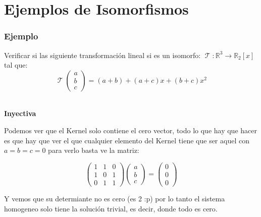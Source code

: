 \documentclass[12pt]{report}                                    %
\DeclareMathOperator \LinealTransformation {\mathcal{T}}        %
\begin{document}
    \section{Ejemplos de Isomorfismos}



            \subsubsection{Ejemplo}
            Verificar si las siguiente transformación lineal si es un isomorfo:
            $\LinealTransformation : \mathbb{R}^3 \to \mathbb{R}_2[x]$ tal que: 
            \begin{equation*}
            \LinealTransformation(\begin{matrix}a\\b\\c\end{matrix}) = (a+b)+(a+c)x+(b+c)x^2
            \end{equation*}


            \textbf{\\Inyectiva}

            Podemos ver que el Kernel solo contiene el cero vector, todo lo que hay que hacer es
            que hay que ver el que cualquier elemento del Kernel tiene que ser aquel con $a=b=c=0$
            para verlo basta ve la matriz:

            \begin{equation*}
            \begin{pmatrix}1&1&0\\1&0&1\\0&1&1\end{pmatrix}
                \begin{pmatrix}a\\b\\c\end{pmatrix}=
                \begin{pmatrix}0\\0\\0\end{pmatrix}
            \end{equation*}

            Y vemos que su determiante no es cero (es 2 :p) por lo tanto el sistema homogeneo solo
            tiene la solución trivial, es decir, donde todo es cero.
\end{document}
